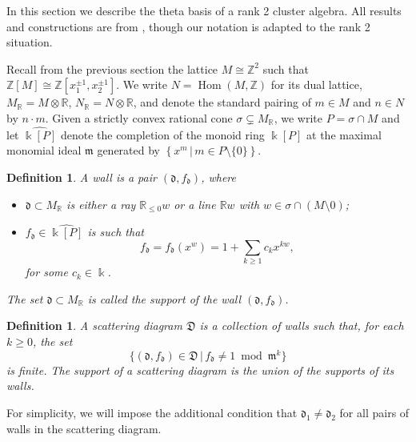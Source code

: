 \documentclass[11pt]{amsart}
\newtheorem{defn}[theorem]{Definition}
\theoremstyle{remark}
\numberwithin{equation}{section}
\newcommand{\RR}{\mathbb{R}}
\newcommand{\ZZ}{\mathbb{Z}}
\newcommand{\fd}{\mathfrak{d}}
\newcommand{\fD}{\mathfrak{D}}
\newcommand{\fm}{\mathfrak{m}}
\newcommand{\Hom}{\operatorname{Hom}}
\begin{document}
In this section we describe the theta basis of a rank 2 cluster algebra.  All results and constructions are from \cite{GHKK}, though our notation is adapted to the rank 2 situation.


Recall from the previous section the lattice $M \cong \ZZ^2$ such that $\ZZ[M] \cong \ZZ[x_1^{\pm 1}, x_2^{\pm 1}]$.  We write $N = \Hom (M, \ZZ)$ for its dual lattice, $M_{\RR} = M\otimes\RR$, $N_{\RR} = N\otimes\RR$, and denote the standard pairing of $m\in M$ and $n\in N$ by $n \cdot m$.  Given a strictly convex rational cone $\sigma \subsetneq M_{\RR}$, we write $P=\sigma \cap M$ and let $\widehat{\Bbbk[P]}$ denote the completion of the monoid ring $\Bbbk[P]$ at the maximal monomial ideal $\fm$ generated by $\left\{x^m \,|\, m\in P\setminus\{0\}\right\}$.

\begin{defn}
  \label{walldef}
  A \emph{wall} is a pair $(\fd, f_{\fd})$, where 
  \begin{itemize}

    \item 
      $\fd \subset M_{\mathbb{R}}$ is either a ray $\RR_{\le 0} w$ or a line
      $\RR w$ with $w\in \sigma \cap(M\setminus 0)$;

    \item 
      $f_{\fd} \in \widehat{\Bbbk [P]}$ is such that 
      \[ 
        f_{\fd} = f_{\fd}(x^w) = 1 + \sum_{k\geq 1} c_k x^{k w},
      \] 
      for some $c_k \in \Bbbk$. 
  \end{itemize}
  The set $\fd \subset M_{\mathbb{R}}$ is called the \emph{support} of the wall
  $(\fd, f_{\fd})$.
\end{defn}

\begin{defn}
  \label{def:scattering_diagram}
  A scattering diagram $\fD$ is a collection of walls such that, for each $k \geq
  0$, the set
  \[
    \{ (\fd, f_{\fd}) \in \fD\, |\, f_{\fd} \neq 1 \bmod \fm^k \}
  \]
  is finite. The support of a scattering diagram is the union of the supports of its walls.%
\end{defn}
For simplicity, we will impose the additional condition that $\fd_1\neq \fd_2$ for all pairs of walls in the scattering diagram.
\end{document}
